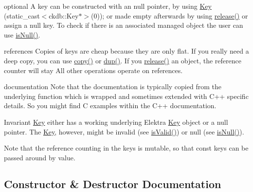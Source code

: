 \begin{DoxyParagraph}{optional}
A key can be constructed with an null pointer, by using \hyperlink{classkdb_1_1Key}{Key} (static\+\_\+cast$<$ckdb\+::\+Key$\ast$$>$(0)); or made empty afterwards by using \hyperlink{classkdb_1_1Key_a9ae719043e6e99f5f3d6fb85837306f8}{release()} or assign a null key. To check if there is an associated managed object the user can use \hyperlink{classkdb_1_1Key_ab70b89caae5fe1e9a2e774733576fa4c}{is\+Null()}.
\end{DoxyParagraph}
\begin{DoxyParagraph}{references}
Copies of keys are cheap because they are only flat. If you really need a deep copy, you can use \hyperlink{classkdb_1_1Key_ab5bc93e22f4cf40b9d2b1fc32cc260be}{copy()} or \hyperlink{classkdb_1_1Key_ababb1ccd9f18db379eb4a62f8db87bf5}{dup()}. If you \hyperlink{classkdb_1_1Key_a9ae719043e6e99f5f3d6fb85837306f8}{release()} an object, the reference counter will stay All other operations operate on references.
\end{DoxyParagraph}
\begin{DoxyParagraph}{documentation}
Note that the documentation is typically copied from the underlying function which is wrapped and sometimes extended with C++ specific details. So you might find C examples within the C++ documentation.
\end{DoxyParagraph}
\begin{DoxyInvariant}{Invariant}
\hyperlink{classkdb_1_1Key}{Key} either has a working underlying Elektra \hyperlink{classkdb_1_1Key}{Key} object or a null pointer. The \hyperlink{classkdb_1_1Key}{Key}, however, might be invalid (see \hyperlink{classkdb_1_1Key_a69e621790e5717c56f7275e0b8d5e27c}{is\+Valid()}) or null (see \hyperlink{classkdb_1_1Key_ab70b89caae5fe1e9a2e774733576fa4c}{is\+Null()}).
\end{DoxyInvariant}
\begin{DoxyNote}{Note}
that the reference counting in the keys is mutable, so that const keys can be passed around by value. 
\end{DoxyNote}


\subsection{Constructor \& Destructor Documentation}
\mbox{\label{classkdb_1_1Key_a5679f5cae63caddd64a60388b9cc77fa}} 
